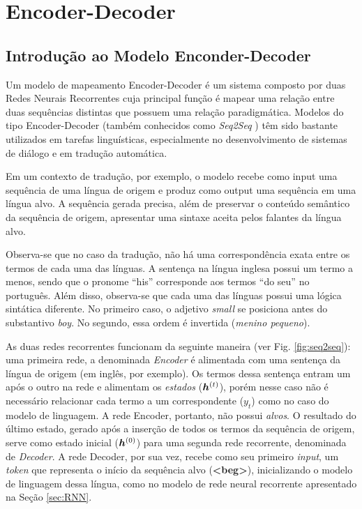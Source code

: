 \chapter{Encoder-Decoder}
\label{ch:05}


\section{Introdução ao Modelo Enconder-Decoder}
\label{sec:intro-sec-sec}
Um modelo de mapeamento Encoder-Decoder é um sistema composto por duas Redes Neurais Recorrentes cuja principal função é mapear uma relação entre duas sequências distintas que possuem uma relação paradigmática. Modelos do tipo Encoder-Decoder (também conhecidos como \textit{Seq2Seq} \cite{seq2seq:2014}) têm sido bastante utilizados em tarefas linguísticas, especialmente no desenvolvimento de sistemas de diálogo e em tradução automática.

Em um contexto de tradução, por exemplo, o modelo recebe como input uma sequência de uma língua de origem e produz como output uma sequência em uma língua alvo. A sequência gerada precisa, além de preservar o conteúdo semântico da sequência de origem, apresentar uma sintaxe aceita pelos falantes da língua alvo. %


Observa-se que no caso da tradução, não há uma correspondência exata entre os termos de cada uma das línguas. A sentença na língua inglesa possui um termo a menos, sendo que o pronome “his” corresponde aos termos “do seu” no português. Além disso, observa-se que cada uma das línguas possui uma lógica sintática diferente. No primeiro caso, o adjetivo \textit{small} se posiciona antes do substantivo \textit{boy}. No segundo, essa ordem é invertida (\textit{menino pequeno}). 

As duas redes recorrentes funcionam da seguinte maneira (ver Fig. \ref{fig:seq2seq}): uma primeira rede, a denominada \textit{Encoder} é alimentada com uma sentença da língua de origem (em inglês, por exemplo). Os termos dessa sentença entram um após o outro na rede e alimentam os \textit{estados} ($\bm{h}^{(t)}$), porém nesse caso não é necessário relacionar cada termo a um correspondente ($y_t$) como no caso do modelo de linguagem. A rede Encoder, portanto, não possui \textit{alvos}. O resultado do último estado, gerado após a inserção de todos os termos da sequência de origem, serve como estado inicial ($\bm{h}^{(0)}$) para uma segunda rede recorrente, denominada de \textit{Decoder}. A rede Decoder, por sua vez, recebe como seu primeiro \textit{input}, um \textit{token} que representa o início da sequência alvo (\textbf{<beg>}), inicializando o modelo de linguagem dessa língua, como no modelo de rede neural recorrente apresentado na Seção \ref{sec:RNN}.  

